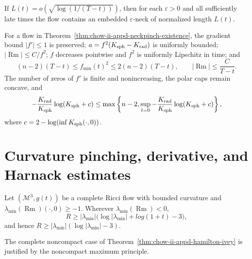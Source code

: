 \begin{remark}
\label{rem:chow-ii-appd-growing-neck-length}
If $L(t)=o(\sqrt{\log(1/(T-t))})$, then for each $\varepsilon>0$ and all
sufficiently late times the flow contains an embedded $\varepsilon$-neck of
normalized length $L(t)$.
\end{remark}

\begin{proposition}
\label{prop:chow-ii-appd-neckpinch-estimates}
For a flow in Theorem~\ref{thm:chow-ii-appd-neckpinch-existence}, the gradient
bound $|f'|\leq1$ is preserved; $a=f^2(K_{\rm sph}-K_{\rm rad})$ is uniformly
bounded; $|\operatorname{Rm}|\leq C/f^2$; $f$ decreases pointwise and $f^2$
is uniformly Lipschitz in time; and
\[
 (n-2)(T-t)\leq f_{\min}(t)^2\leq2(n-2)(T-t),\qquad
 |\operatorname{Rm}|\leq\frac C{T-t}.
\]
The number of zeros of $f'$ is finite and nonincreasing, the polar caps remain
concave, and
\[
 -\frac{K_{\rm rad}}{K_{\rm sph}}\log(K_{\rm sph}+c)
 \leq\max\left\{n-2,
 \sup_{t=0}-\frac{K_{\rm rad}}{K_{\rm sph}}
 \log(K_{\rm sph}+c)\right\},
\]
where $c=2-\log(\inf K_{\rm sph}(\cdot,0))$.
\end{proposition}

\section{Curvature pinching, derivative, and Harnack estimates}

\begin{theorem}
\label{thm:chow-ii-appd-hamilton-ivey}
Let $(\mathcal M^3,g(t))$ be a complete Ricci flow with bounded curvature and
$\lambda_{\min}(\operatorname{Rm})(\cdot,0)\geq-1$. Wherever
$\lambda_{\min}(\operatorname{Rm})<0$,
\[
 R\geq|\lambda_{\min}|\bigl(\log|\lambda_{\min}|+log(1+t)-3\bigr),
\]
and hence $R\geq|\lambda_{\min}|(\log|\lambda_{\min}|-3)$.
\end{theorem}

\begin{remark}
\label{rem:chow-ii-appd-hamilton-ivey-noncompact}
The complete noncompact case of Theorem~\ref{thm:chow-ii-appd-hamilton-ivey}
is justified by the noncompact maximum principle.
\end{remark}


